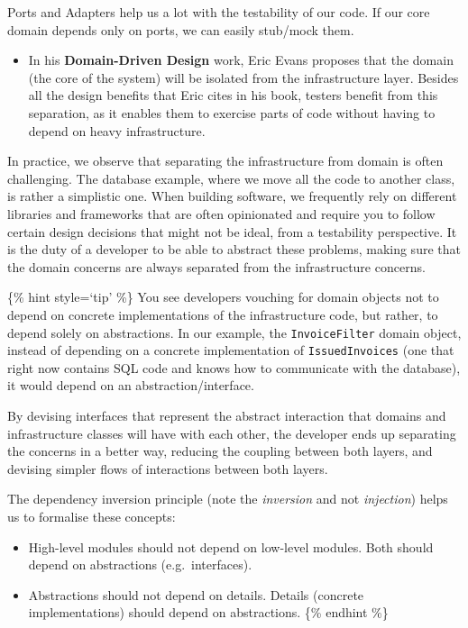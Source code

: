Ports and Adapters help us a lot with the testability of our code. If
our core domain depends only on ports, we can easily stub/mock them.

\begin{itemize}
\tightlist
\item
  In his \textbf{Domain-Driven Design} work, Eric Evans proposes that
  the domain (the core of the system) will be isolated from the
  infrastructure layer. Besides all the design benefits that Eric cites
  in his book, testers benefit from this separation, as it enables them
  to exercise parts of code without having to depend on heavy
  infrastructure.
\end{itemize}

In practice, we observe that separating the infrastructure from domain
is often challenging. The database example, where we move all the code
to another class, is rather a simplistic one. When building software, we
frequently rely on different libraries and frameworks that are often
opinionated and require you to follow certain design decisions that
might not be ideal, from a testability perspective. It is the duty of a
developer to be able to abstract these problems, making sure that the
domain concerns are always separated from the infrastructure concerns.

\{\% hint style=`tip' \%\} You see developers vouching for domain
objects not to depend on concrete implementations of the infrastructure
code, but rather, to depend solely on abstractions. In our example, the
\texttt{InvoiceFilter} domain object, instead of depending on a concrete
implementation of \texttt{IssuedInvoices} (one that right now contains
SQL code and knows how to communicate with the database), it would
depend on an abstraction/interface.

By devising interfaces that represent the abstract interaction that
domains and infrastructure classes will have with each other, the
developer ends up separating the concerns in a better way, reducing the
coupling between both layers, and devising simpler flows of interactions
between both layers.

The dependency inversion principle (note the \emph{inversion} and not
\emph{injection}) helps us to formalise these concepts:

\begin{itemize}
\tightlist
\item
  High-level modules should not depend on low-level modules. Both should
  depend on abstractions (e.g.~interfaces).
\item
  Abstractions should not depend on details. Details (concrete
  implementations) should depend on abstractions. \{\% endhint \%\}
\end{itemize}

